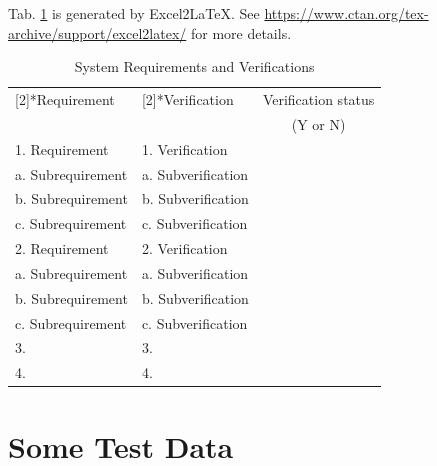 \documentclass{senior-design}
\begin{document}
\begin{appendices}
    Tab. \ref{tab:srv} is generated by Excel2LaTeX. See \url{https://www.ctan.org/tex-archive/support/excel2latex/} for more details.
    \begin{table}[htbp]
        \centering
        \caption{System Requirements and Verifications}
        \begin{tabularx}{\textwidth}{X|X|c}
            \toprule
            \centering\multirow{2}[2]{*}{Requirement} & \centering\multirow{2}[2]{*}{Verification} & \multicolumn{1}{c}{Verification status} \\
            \multicolumn{1}{c|}{}                     & \multicolumn{1}{c|}{}                      & \multicolumn{1}{c}{(Y or N)}                     \\
            \midrule
            1. Requirement                            & 1. Verification                            & \multirow{4}[1]{*}{}                             \\
            a. Subrequirement                         & a. Subverification                         &                                                  \\
            b. Subrequirement                         & b. Subverification                         &                                                  \\
            c. Subrequirement                         & c. Subverification                         &                                                  \\\hline
            2. Requirement                            & 2. Verification                            & \multirow{4}[0]{*}{}                             \\
            a. Subrequirement                         & a. Subverification                         &                                                  \\
            b. Subrequirement                         & b. Subverification                         &                                                  \\
            c. Subrequirement                         & c. Subverification                         &                                                  \\\hline
            3.                                        & 3.                                         &                                                  \\\hline
            4.                                        & 4.                                         &                                                  \\\bottomrule
        \end{tabularx}%
        \label{tab:srv}%
    \end{table}%

    \section{Some Test Data}
\end{appendices}
\clearpage
\backmatter
\end{document}
